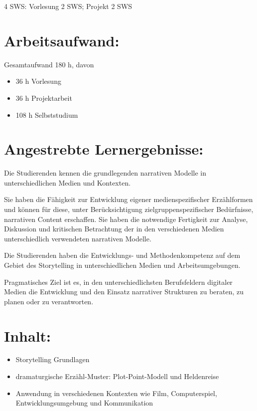 4 SWS: Vorlesung 2 SWS; Projekt 2 SWS

\section*{Arbeitsaufwand:}\label{arbeitsaufwand-23}

Gesamtaufwand 180 h, davon

\begin{itemize}
\item
  36 h Vorlesung
\item
  36 h Projektarbeit
\item
  108 h Selbststudium
\end{itemize}

\section*{Angestrebte
Lernergebnisse:}\label{angestrebte-lernergebnisse-17}

Die Studierenden kennen die grundlegenden narrativen Modelle in
unterschiedlichen Medien und Kontexten.

Sie haben die Fähigkeit zur Entwicklung eigener medienspezifischer
Erzählformen und können für diese, unter Berücksichtigung
zielgruppenspezifischer Bedürfnisse, narrativen Content erschaffen. Sie
haben die notwendige Fertigkeit zur Analyse, Diskussion und kritischen
Betrachtung der in den verschiedenen Medien unterschiedlich verwendeten
narrativen Modelle.

Die Studierenden haben die Entwicklungs- und Methodenkompetenz auf dem
Gebiet des Storytelling in unterschiedlichen Medien und
Arbeitsumgebungen.

Pragmatisches Ziel ist es, in den unterschiedlichsten Berufsfeldern
digitaler Medien die Entwicklung und den Einsatz narrativer Strukturen
zu beraten, zu planen oder zu verantworten.

\section*{Inhalt:}\label{inhalt-17}

\begin{itemize}
\item
  Storytelling Grundlagen
\item
  dramaturgische Erzähl-Muster: Plot-Point-Modell und Heldenreise
\item
  Anwendung in verschiedenen Kontexten wie Film, Computerspiel,
  Entwicklungsumgebung und Kommunikation
\end{itemize}

